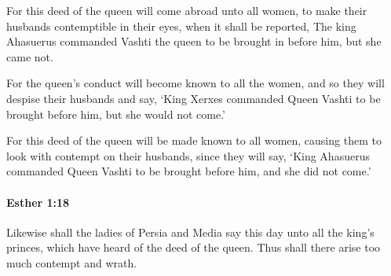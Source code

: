 			\begin{versebox}
					\item[BHS] 
					\item[LXX] 
					\item[ASV] For this deed of the queen will come abroad unto all women, to make their husbands contemptible in their eyes, when it shall be reported, The king Ahasuerus commanded Vashti the queen to be brought in before him, but she came not.
					\item[NIV] For the queen’s conduct will become known to all the women, and so they will despise their husbands and say, ‘King Xerxes commanded Queen Vashti to be brought before him, but she would not come.’
					\item[NRSV] For this deed of the queen will be made known to all women, causing them to look with contempt on their husbands, since they will say, ‘King Ahasuerus commanded Queen Vashti to be brought before him, and she did not come.’
			\end{versebox}

		\paragraph{Esther 1:18} %
			\label{ESTHER-1-18}

			Likewise shall the ladies of Persia and Media say this day unto all the king’s princes, which have heard of the deed of the queen. Thus shall there arise too much contempt and wrath.

